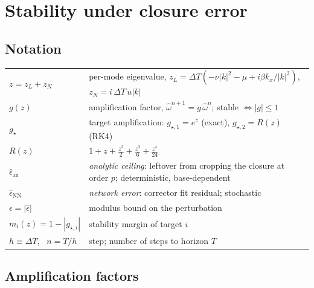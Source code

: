 \documentclass[11pt]{article}
\begin{document}

\section{Stability under closure error}

\subsection{Notation}
\label{sec:stab-notation}

\noindent
\begin{tabular}{@{}ll@{}}
$z=z_L+z_N$ & per-mode eigenvalue, $z_L=\Delta T(-\nu|k|^2-\mu+i\beta k_x/|k|^2)$, $z_N=i\,\Delta T\,u|k|$\\
$g(z)$ & amplification factor, $\hat\omega^{n+1}=g\,\hat\omega^{n}$; stable $\iff|g|\le1$\\
$g_{\star}$ & target amplification: $g_{\star,1}=e^{z}$ (exact), $g_{\star,2}=R(z)$ (RK4)\\
$R(z)$ & $1+z+\tfrac{z^2}{2}+\tfrac{z^3}{6}+\tfrac{z^4}{24}$\\
$\hat\epsilon_{\mathrm{an}}$ & \emph{analytic ceiling}: leftover from cropping the closure at order $p$; deterministic, base-dependent\\
$\hat\epsilon_{\mathrm{NN}}$ & \emph{network error}: corrector fit residual; stochastic\\
$\epsilon=|\hat\epsilon|$ & modulus bound on the perturbation\\
$m_i(z)=1-|g_{\star,i}|$ & stability margin of target $i$\\
$h\equiv\Delta T$, \ $n=T/h$ & step; number of steps to horizon $T$\\
\end{tabular}

\subsection{Amplification factors}
\label{sec:stab-amp}
\end{document}
